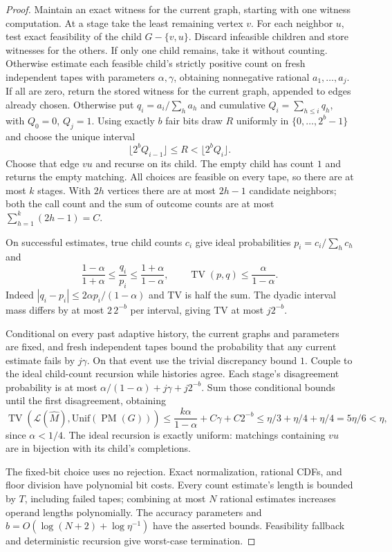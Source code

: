 \documentclass[11pt]{article}
\newcommand{\PM}{\operatorname{PM}}
\newcommand{\TV}{\operatorname{TV}}
\begin{document}
\begin{proof}
Maintain an exact witness for the current graph, starting with one witness computation. At a stage take the least remaining vertex $v$. For each neighbor $u$, test exact feasibility of the child $G-\{v,u\}$. Discard infeasible children and store witnesses for the others. If only one child remains, take it without counting. Otherwise estimate each feasible child's strictly positive count on fresh independent tapes with parameters $\alpha,\gamma$, obtaining nonnegative rational $a_1,\ldots,a_j$. If all are zero, return the stored witness for the current graph, appended to edges already chosen. Otherwise put $q_i=a_i/\sum_h a_h$ and cumulative $Q_i=\sum_{h\le i}q_h$, with $Q_0=0$, $Q_j=1$. Using exactly $b$ fair bits draw $R$ uniformly in $\{0,\ldots,2^b-1\}$ and choose the unique interval
\[
 \lfloor2^bQ_{i-1}\rfloor\le R<\lfloor2^bQ_i\rfloor.
\]
Choose that edge $vu$ and recurse on its child. The empty child has count $1$ and returns the empty matching. All choices are feasible on every tape, so there are at most $k$ stages. With $2h$ vertices there are at most $2h-1$ candidate neighbors; both the call count and the sum of outcome counts are at most $\sum_{h=1}^k(2h-1)=C$.

On successful estimates, true child counts $c_i$ give ideal probabilities $p_i=c_i/\sum_h c_h$ and
\[
 \frac{1-\alpha}{1+\alpha}\le\frac{q_i}{p_i}
 \le\frac{1+\alpha}{1-\alpha},\qquad
 \TV(p,q)\le\frac{\alpha}{1-\alpha}.
\]
Indeed $|q_i-p_i|\le2\alpha p_i/(1-\alpha)$ and TV is half the sum. The dyadic interval mass differs by at most $2\,2^{-b}$ per interval, giving TV at most $j2^{-b}$.

Conditional on every past adaptive history, the current graphs and parameters are fixed, and fresh independent tapes bound the probability that any current estimate fails by $j\gamma$. On that event use the trivial discrepancy bound $1$. Couple to the ideal child-count recursion while histories agree. Each stage's disagreement probability is at most $\alpha/(1-\alpha)+j\gamma+j2^{-b}$. Sum those conditional bounds until the first disagreement, obtaining
\[
 \TV(\mathcal L(\widehat M),\mathrm{Unif}(\PM(G)))
 \le \frac{k\alpha}{1-\alpha}+C\gamma+C2^{-b}
 \le\eta/3+\eta/4+\eta/4=5\eta/6<\eta,
\]
since $\alpha<1/4$. The ideal recursion is exactly uniform: matchings containing $vu$ are in bijection with its child's completions.

The fixed-bit choice uses no rejection. Exact normalization, rational CDFs, and floor division have polynomial bit costs. Every count estimate's length is bounded by $T$, including failed tapes; combining at most $N$ rational estimates increases operand lengths polynomially. The accuracy parameters and $b=O(\log(N+2)+\log\eta^{-1})$ have the asserted bounds. Feasibility fallback and deterministic recursion give worst-case termination.
\end{proof}
\end{document}
